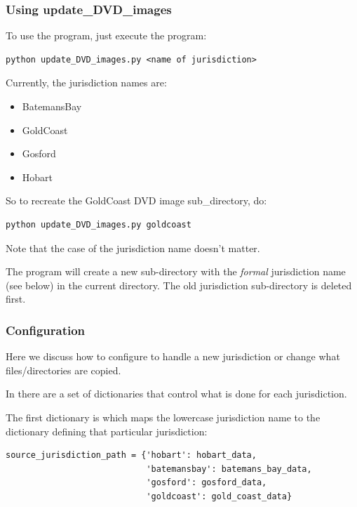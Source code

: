\documentclass{manual}
\begin{document}
\subsubsection{Using update_DVD_images}
\label{subsubsec:update_DVD_images_use}

To use the  program, just execute the program:

\begin{verbatim}
python update_DVD_images.py <name of jurisdiction>
\end{verbatim}

Currently, the jurisdiction names are:

\begin{itemize}
  \item BatemansBay
  \item GoldCoast
  \item Gosford
  \item Hobart
\end{itemize}

So to recreate the GoldCoast DVD image sub_directory, do:

\begin{verbatim}
python update_DVD_images.py goldcoast
\end{verbatim}

Note that the case of the jurisdiction name doesn't matter.

The program will create a new sub-directory with the \emph{formal} jurisdiction name (see below)
in the current directory.  The old jurisdiction sub-directory is deleted first.

\subsubsection{Configuration}
\label{subsubsec:update_DVD_images_config}

Here we discuss how to configure  to handle a new jurisdiction or
change what files/directories are copied.

In  there are a set of dictionaries that control what is done for each
jurisdiction.

The first dictionary is  which maps the lowercase jurisdiction name
to the dictionary defining that particular jurisdiction:

\begin{verbatim}
source_jurisdiction_path = {'hobart': hobart_data,
                            'batemansbay': batemans_bay_data,
                            'gosford': gosford_data,
                            'goldcoast': gold_coast_data}
\end{verbatim}
\end{document}
